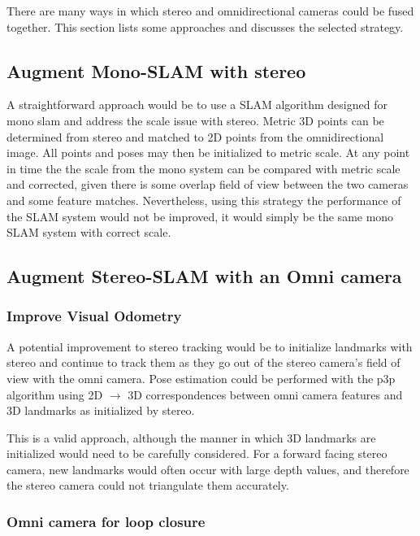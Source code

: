 There are many ways in which stereo and omnidirectional cameras could be fused together.  This section lists some approaches and discusses the selected strategy.

\subsection{Augment Mono-SLAM with stereo}

A straightforward approach would be to use a SLAM algorithm designed for mono slam and address the scale issue with stereo.  Metric 3D points can be determined from stereo and matched to 2D points from the omnidirectional image.  All points and poses may then be initialized to metric scale.  At any point in time the the scale from the mono system can be compared with metric scale and corrected, given there is some overlap field of view between the two cameras and some feature matches.  Nevertheless, using this strategy the performance of the SLAM system would not be improved, it would simply be the same mono SLAM system with correct scale.

\subsection{Augment Stereo-SLAM with an Omni camera}

\subsubsection{Improve Visual Odometry}

A potential improvement to stereo tracking would be to initialize landmarks with stereo and continue to track them as they go out of the stereo camera's field of view with the omni camera.  Pose estimation could be performed with the p3p algorithm using 2D $\rightarrow$ 3D correspondences between omni camera features and 3D landmarks as initialized by stereo.

This is a valid approach, although the manner in which 3D landmarks are initialized would need to be carefully considered.  For a forward facing stereo camera, new landmarks would often occur with large depth values, and therefore the stereo camera could not triangulate them accurately.

\subsubsection{Omni camera for loop closure}

